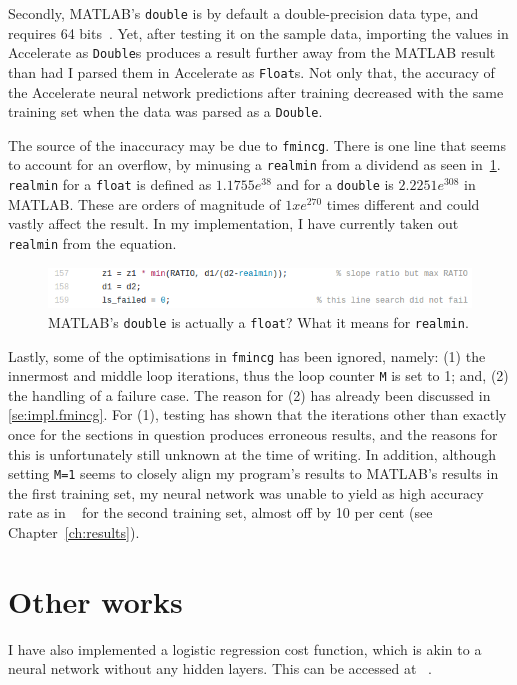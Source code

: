 Secondly, MATLAB's \texttt{double} is by default a double-precision data type, and requires 64 bits~\cite{Mat17}. Yet, after testing it on the sample data, importing the values in Accelerate as \texttt{Double}s produces a result further away from the MATLAB result than had I parsed them in Accelerate as \texttt{Float}s. Not only that, the accuracy of the Accelerate neural network predictions after training decreased with the same training set when the data was parsed as a \texttt{Double}. 

The source of the inaccuracy may be due to \texttt{fmincg}. There is one line that seems to account for an overflow, by minusing a \texttt{realmin} from a dividend as seen in~\ref{fig:realmin}. \texttt{realmin} for a \texttt{float} is defined as $1.1755e^{38}$ and for a \texttt{double} is $2.2251e^{308}$ in MATLAB. These are orders of magnitude of $1xe^{270}$ times different and could vastly affect the result. In my implementation, I have currently taken out \texttt{realmin} from the equation.

\begin{figure}
	\centerline{\includegraphics[width=\linewidth]{realmin.png}}
	\caption{MATLAB's \texttt{double} is actually a \texttt{float}? What it means for \texttt{realmin}.}
	\label{fig:realmin}
\end{figure}

Lastly, some of the optimisations in \texttt{fmincg} has been ignored, namely: (1) the innermost and middle loop iterations, thus the loop counter \texttt{M} is set to 1; and, (2) the handling of a failure case. The reason for (2) has already been discussed in \ref{se:impl.fmincg}. For (1), testing has shown that the iterations other than exactly once for the sections in question produces erroneous results, and the reasons for this is unfortunately still unknown at the time of writing. In addition, although setting \texttt{M=1} seems to closely align my program's results to MATLAB's results in the first training set, my neural network was unable to yield as high accuracy rate as in ~\cite{LeC98} for the second training set, almost off by 10 per cent (see Chapter~\ref{ch:results}).

\section{Other works}
I have also implemented a logistic regression cost function, which is akin to a neural network without any hidden layers. This can be accessed at ~\cite{McDJeo}.